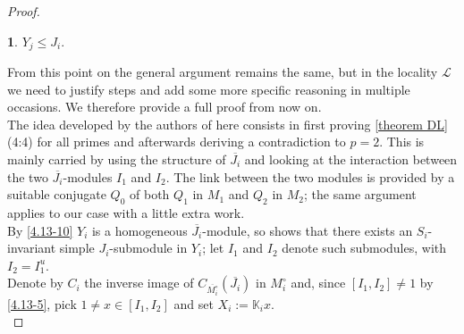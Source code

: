 \documentclass{amsart}
\numberwithin{equation}{section}
\theoremstyle{definition}
\theoremstyle{subresult}
\newtheorem{subresult}{}[equation]
\theoremstyle{caseresult}
\newcommand{\bK}{\mathbb{K}}
\renewcommand{\L}{\mathcal{L}}
\newcommand{\ov}{\overline}
\newcommand{\<}{\langle}
\renewcommand{\>}{\rangle}
\begin{document}
\begin{proof}
	\begin{subresult}\label{4.13-11}
		$Y_j \le J_i$.
	\end{subresult}
	
	From this point on the general argument remains the same, but in the locality $\L$ we need to justify steps and add some more specific reasoning in multiple occasions. We therefore provide a full proof from now on.\\
	The idea developed by the authors of \cite[Lemma 4.13]{Meier-Stell-Stroth:2012} here consists in first proving \ref{theorem DL}(4:4) for all primes and afterwards deriving a contradiction to $p=2$. This is mainly carried by using the structure of $\ov{J_i}$ and looking at the interaction between the two $\ov{J_i}$-modules $I_1$ and $I_2$. The link between the two modules is provided by a suitable conjugate $Q_0$ of both $Q_1$ in $M_1$ and $Q_2$ in $M_2$; the same argument applies to our case with a little extra work.\\
	By \eqref{4.13-10} $Y_i$ is a homogeneous $\ov{J_i}$-module, so \cite[Lemma 5.2(d)]{MS:2008} shows that there exists an $S_i$-invariant simple $J_i$-submodule in $Y_i$; let $I_1$ and $I_2$ denote such submodules, with $I_2 = I_1^u$.\\
	Denote by $C_i$ the inverse image of $C_{\ov{M_i^\circ}}(\ov{J_i})$ in $M_i^\circ$ and, since $[I_1,I_2] \ne 1$ by \eqref{4.13-5}, pick $1 \ne x \in [I_1,I_2]$ and set $X_i := \bK_i x$.\\
	

\end{proof}
\end{document}
